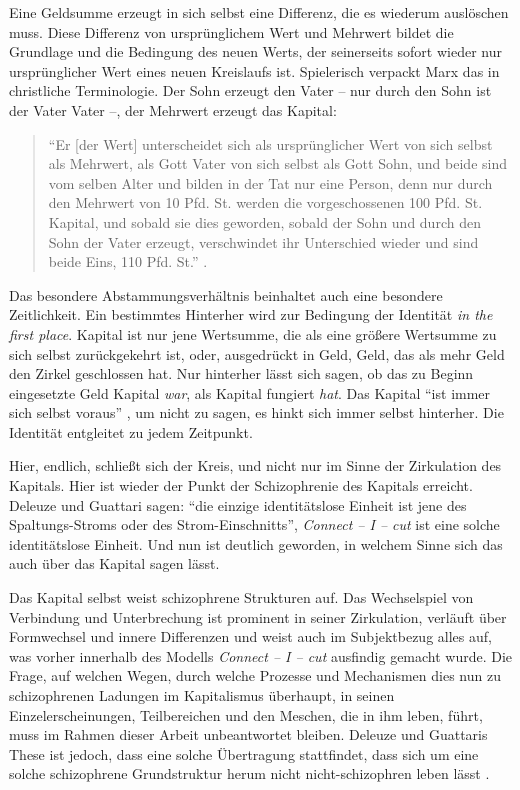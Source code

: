 \documentclass[12pt,
               paper=a4,
               twoside=false,
               onehalfspacing,
               bibliography=totoc,
               toc=graduated,
               ]{scrartcl}
\newcommand{\pc}[2]{\parencite[#1]{#2}}
\newcommand{\vgl}[2]{\parencite[vgl.][#1]{#2}}
\newcommand{\cic}{Connect -- I -- cut\xspace}
\newcommand{\dg}{Deleuze und Guattari\xspace}
\begin{document}
Eine Geldsumme erzeugt in sich selbst eine Differenz, die es wiederum
auslöschen muss. Diese Differenz von ursprünglichem Wert und Mehrwert
bildet die Grundlage und die Bedingung des neuen Werts, der
seinerseits sofort wieder nur \glq ursprünglicher\grq{} Wert eines
neuen Kreislaufs ist. Spielerisch verpackt Marx das in christliche
Terminologie. Der Sohn erzeugt den Vater -- nur durch den Sohn ist der
Vater Vater --, der Mehrwert erzeugt das Kapital:
%
\begin{spacing}{1}
\begin{quote}
"`Er [der Wert] unterscheidet sich als ursprünglicher
Wert von sich selbst als Mehrwert, als Gott Vater von sich selbst als
Gott Sohn, und beide sind vom selben Alter und bilden in der Tat nur
eine Person, denn nur durch den Mehrwert von 10 Pfd. St. werden die
vorgeschossenen 100 Pfd. St. Kapital, und sobald sie dies geworden,
sobald der Sohn und durch den Sohn der Vater erzeugt, verschwindet ihr
Unterschied wieder und sind beide Eins, 110 Pfd. St."' \pc{S. 169
f.}{kap}.
\end{quote}
\end{spacing}

Das besondere Abstammungsverhältnis beinhaltet auch eine besondere
Zeitlichkeit. Ein bestimmtes \glq Hinterher\grq{} wird zur Bedingung
der Identität \emph{in the first place}. Kapital ist nur jene
Wertsumme, die als eine größere Wertsumme zu sich selbst zurückgekehrt
ist, oder, ausgedrückt in Geld, Geld, das als mehr Geld den Zirkel
geschlossen hat. Nur hinterher lässt sich sagen, ob das zu Beginn
eingesetzte Geld Kapital \emph{war}, als Kapital fungiert \emph{hat}.
Das Kapital "`ist immer sich selbst voraus"' \pc{125}{strauss}, um
nicht zu sagen, es hinkt sich immer selbst hinterher. Die Identität
entgleitet zu jedem Zeitpunkt.

Hier, endlich, schließt sich der Kreis, und nicht nur im Sinne der
Zirkulation des Kapitals. Hier ist wieder der Punkt der Schizophrenie
des Kapitals erreicht. \dg sagen: "`die einzige identitätslose Einheit
ist jene des Spaltungs-Stroms oder des Strom-Einschnitts"',
\emph{\cic} ist eine solche identitätslose Einheit. Und nun ist
deutlich geworden, in welchem Sinne sich das auch über das Kapital
sagen lässt.

Das Kapital selbst weist schizophrene Strukturen auf. Das Wechselspiel
von Verbindung und Unterbrechung ist prominent in seiner Zirkulation,
verläuft über Formwechsel und innere Differenzen und weist auch im
Subjektbezug alles auf, was vorher innerhalb des Modells \emph{\cic}
ausfindig gemacht wurde. Die Frage, auf welchen Wegen, durch welche
Prozesse und Mechanismen dies nun zu schizophrenen Ladungen im
Kapitalismus überhaupt, in seinen Einzelerscheinungen, Teilbereichen
und den Meschen, die in ihm leben, führt, muss im Rahmen dieser Arbeit
unbeantwortet bleiben. Deleuze und Guattaris These ist jedoch, dass
eine solche Übertragung stattfindet, dass sich um eine solche
schizophrene Grundstruktur herum nicht nicht-schizophren leben lässt
\vgl{S. 315 f.}{ao}.
\end{document}
